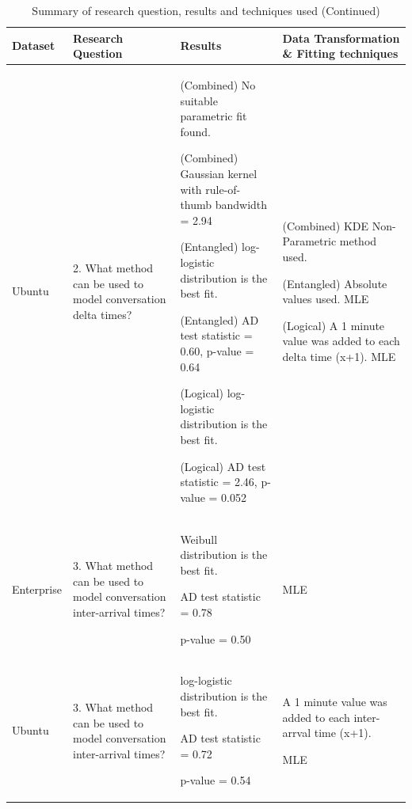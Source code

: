 

\begin{table}
\begin{flushleft}
\caption {Summary of research question, results and techniques used (Continued)}
\label{tab:chapt6tab3}
\begin{tabular}{| L{1.9cm} | C{4cm} | C{9.5cm} | C{5cm} |} \hline 
\textbf{Dataset} & \textbf{Research Question} & \textbf{Results} & \textbf{Data Transformation \& Fitting techniques} 

\\ \hline Ubuntu & 2. What method can be used to model conversation delta times? & 
(Combined) No suitable parametric fit found. 
\par (Combined)  Gaussian kernel with rule-of-thumb bandwidth = 2.94
\par (Entangled)  log-logistic distribution is the best fit.
\par (Entangled) AD test statistic = 0.60, p-value = 0.64
\par (Logical)  log-logistic distribution is the best fit.
\par (Logical) AD test statistic = 2.46, p-value = 0.052
& 
(Combined) KDE Non-Parametric method used. \cite{rosenblatt1956remarks}\cite{parzen1962estimation}
\cite{silverman1986density}  
\par (Entangled) Absolute values used. MLE \cite{fisher1925theory} \cite {wilks1938large}
\par (Logical) A 1 minute value was added to each delta time (x+1). MLE \cite{fisher1925theory} \cite {wilks1938large}

\\ \hline Enterprise & 3. What method can be used to model conversation inter-arrival times?  & Weibull distribution is the best fit. \par AD test statistic = 0.78 \par p-value = 0.50 & MLE \cite{fisher1925theory} \cite {wilks1938large}

\\ \hline Ubuntu & 3. What method can be used to model conversation inter-arrival times? & log-logistic distribution is the best fit. \par AD test statistic = 0.72 \par p-value = 0.54 & A 1 minute value was added to each inter-arrval time (x+1). \par MLE \cite{fisher1925theory} \cite {wilks1938large}



\\ \hline 
 \end{tabular}
\end{flushleft}
\end{table}

